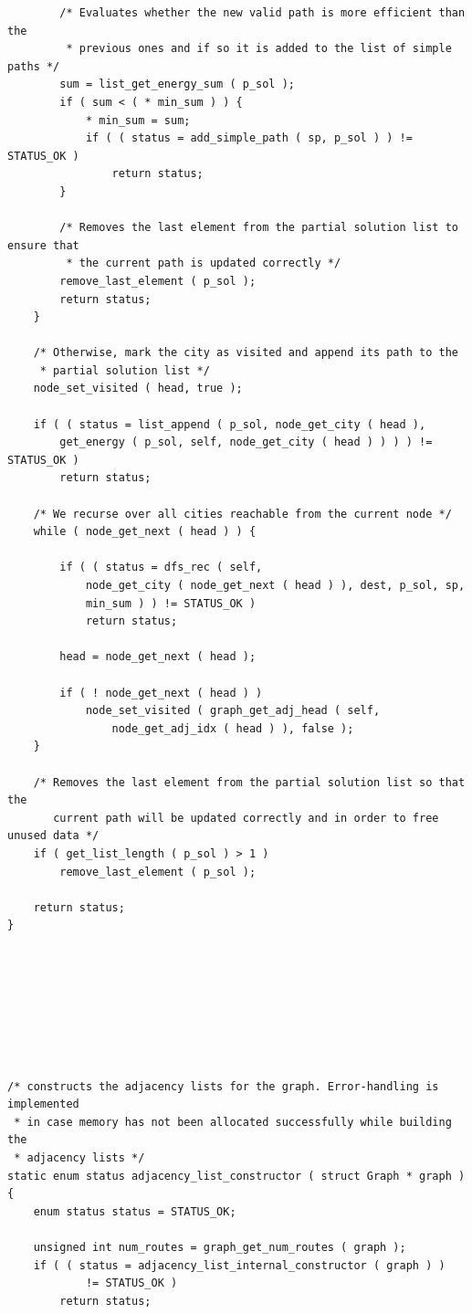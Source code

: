 \documentclass[11pt]{article}
\begin{document}
\begin{verbatim}
        /* Evaluates whether the new valid path is more efficient than the
         * previous ones and if so it is added to the list of simple paths */
        sum = list_get_energy_sum ( p_sol );
        if ( sum < ( * min_sum ) ) {
            * min_sum = sum;
            if ( ( status = add_simple_path ( sp, p_sol ) ) != STATUS_OK )
                return status;
        }

        /* Removes the last element from the partial solution list to ensure that
         * the current path is updated correctly */
        remove_last_element ( p_sol );
        return status;
    }

    /* Otherwise, mark the city as visited and append its path to the
     * partial solution list */
    node_set_visited ( head, true );

    if ( ( status = list_append ( p_sol, node_get_city ( head ),
        get_energy ( p_sol, self, node_get_city ( head ) ) ) ) != STATUS_OK )
        return status;

    /* We recurse over all cities reachable from the current node */
    while ( node_get_next ( head ) ) {

        if ( ( status = dfs_rec ( self,
            node_get_city ( node_get_next ( head ) ), dest, p_sol, sp,
            min_sum ) ) != STATUS_OK )
            return status;

        head = node_get_next ( head );

        if ( ! node_get_next ( head ) )
            node_set_visited ( graph_get_adj_head ( self,
                node_get_adj_idx ( head ) ), false );
    }

    /* Removes the last element from the partial solution list so that the
       current path will be updated correctly and in order to free unused data */
    if ( get_list_length ( p_sol ) > 1 )
        remove_last_element ( p_sol );

    return status;
}








/* constructs the adjacency lists for the graph. Error-handling is implemented
 * in case memory has not been allocated successfully while building the
 * adjacency lists */
static enum status adjacency_list_constructor ( struct Graph * graph )
{
    enum status status = STATUS_OK;

    unsigned int num_routes = graph_get_num_routes ( graph );
    if ( ( status = adjacency_list_internal_constructor ( graph ) )
            != STATUS_OK )
        return status;


\end{verbatim}
\end{document}
